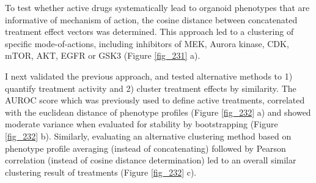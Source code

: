 \begin{flushleft}
To test whether active drugs systematically lead to organoid phenotypes that are informative of mechanism of action, the cosine distance between concatenated treatment effect vectors was determined. This approach led to a clustering of specific mode-of-actions, including inhibitors of MEK, Aurora kinase, CDK, mTOR, AKT, EGFR or GSK3 (Figure \ref{fig_231} a). 

\bigbreak
I next validated the previous approach, and tested alternative methods to 1) quantify treatment activity and 2) cluster treatment effects by similarity. The AUROC score which was previously used to define active treatments, correlated with the euclidean distance of phenotype profiles (Figure \ref{fig_232} a) and showed moderate variance when evaluated for stability by bootstrapping (Figure \ref{fig_232} b). Similarly, evaluating an alternative clustering method based on phenotype profile averaging (instead of concatenating) followed by Pearson correlation (instead of cosine distance determination) led to an overall similar clustering result of treatments (Figure \ref{fig_232} c). 


\end{flushleft}
